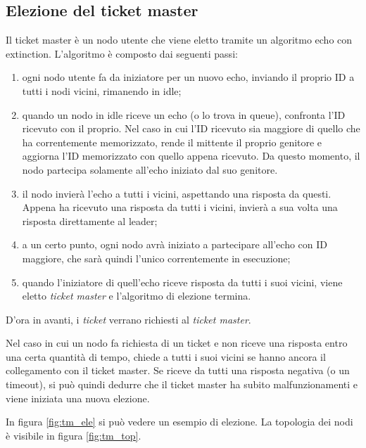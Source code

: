 \subsection{Elezione del ticket master} \label{sub:tm_ele}
Il ticket master è un nodo utente che viene eletto tramite un algoritmo echo con extinction.
L'algoritmo è composto dai seguenti passi:
\begin{enumerate}
    \item ogni nodo utente fa da iniziatore per un nuovo echo, inviando il proprio ID a tutti i nodi vicini, rimanendo in idle;
    \item quando un nodo in idle riceve un echo (o lo trova in queue), confronta l'ID ricevuto con il proprio. Nel caso in cui l'ID ricevuto sia maggiore 
            di quello che ha correntemente memorizzato, rende il mittente il proprio genitore e aggiorna l'ID memorizzato 
            con quello appena ricevuto. Da questo momento, il nodo partecipa solamente all'echo iniziato dal suo genitore. 
    \item \label{ticket:ok_step} il nodo invierà l'echo a tutti i vicini, aspettando una risposta da questi. 
            Appena ha ricevuto una risposta da tutti i vicini, invierà a sua volta una risposta direttamente al leader;
    \item a un certo punto, ogni nodo avrà iniziato a partecipare all'echo con ID maggiore, che sarà quindi l'unico correntemente in esecuzione;
    \item quando l'iniziatore di quell'echo riceve risposta da tutti i suoi vicini, viene eletto \textit{ticket master} e l'algoritmo di elezione termina.
\end{enumerate}
D'ora in avanti, i \textit{ticket} verrano richiesti al \textit{ticket master}.

Nel caso in cui un nodo fa richiesta di un ticket e non riceve una risposta entro una certa quantità di tempo, 
chiede a tutti i suoi vicini se hanno ancora il collegamento con il ticket master. Se riceve da tutti una risposta
negativa (o un timeout), si può quindi dedurre che il ticket master ha subito malfunzionamenti e viene iniziata una nuova elezione.

In figura \ref{fig:tm_ele} si può vedere un esempio di elezione. La topologia dei nodi è visibile in figura \ref{fig:tm_top}.

